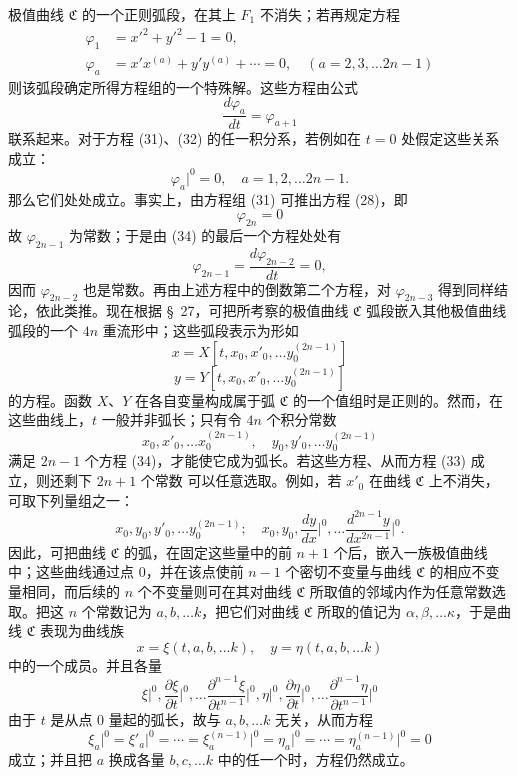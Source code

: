 \documentclass[11pt,a4paper,leqno]{article}
\begin{document}
极值曲线 $\mathfrak C$ 的一个正则弧段，在其上 $F_1$ 不消失；若再规定方程
\begin{equation}\tag{33}
\begin{aligned}
\varphi_1&=x'^2+y'^2-1=0,\\
\varphi_a&=x'x^{(a)}+y'y^{(a)}+\cdots=0,\quad (a=2,3,\ldots 2n-1)
\end{aligned}
\end{equation}
则该弧段确定所得方程组的一个特殊解。这些方程由公式
\[
\frac{d\varphi_a}{dt}=\varphi_{a+1}
\]
联系起来。对于方程 (31)、(32) 的任一积分系，若例如在 $t=0$ 处假定这些关系成立：
\begin{equation}\tag{34}
\varphi_a\bigg|^0=0,\quad a=1,2,\ldots 2n-1.
\end{equation}
那么它们处处成立。事实上，由方程组 (31) 可推出方程 (28)，即
\[
\varphi_{2n}=0
\]
故 $\varphi_{2n-1}$ 为常数；于是由 (34) 的最后一个方程处处有
\[
\varphi_{2n-1}=\frac{d\varphi_{2n-2}}{dt}=0,
\]
因而 $\varphi_{2n-2}$ 也是常数。再由上述方程中的倒数第二个方程，对 $\varphi_{2n-3}$ 得到同样结论，依此类推。现在根据 \S~27，可把所考察的极值曲线 $\mathfrak C$ 弧段嵌入其他极值曲线弧段的一个 $4n$ 重流形中；这些弧段表示为形如
\[
x=X[t,x_0,x'_0,\ldots y_0^{(2n-1)}]
\]
\[
y=Y[t,x_0,x'_0,\ldots y_0^{(2n-1)}]
\]
的方程。函数 $X$、$Y$ 在各自变量构成属于弧 $\mathfrak C$ 的一个值组时是正则的。然而，在这些曲线上，$t$ 一般并非弧长；只有令 $4n$ 个积分常数
\[
x_0,x'_0,\ldots x_0^{(2n-1)},\quad y_0,y'_0,\ldots y_0^{(2n-1)}
\]
满足 $2n-1$ 个方程 (34)，才能使它成为弧长。若这些方程、从而方程 (33) 成立，则还剩下 $2n+1$ 个常数
可以任意选取。例如，若 $x'_0$ 在曲线 $\mathfrak C$ 上不消失，可取下列量组之一：
\[
x_0,y_0,y'_0,\ldots y_0^{(2n-1)};\quad
x_0,y_0,\frac{dy}{dx}\bigg|^0,\ldots \frac{d^{2n-1}y}{dx^{2n-1}}\bigg|^0.
\]
因此，可把曲线 $\mathfrak C$ 的弧，在固定这些量中的前 $n+1$ 个后，嵌入一族极值曲线中；这些曲线通过点 0，并在该点使前 $n-1$ 个密切不变量与曲线 $\mathfrak C$ 的相应不变量相同，而后续的 $n$ 个不变量则可在其对曲线 $\mathfrak C$ 所取值的邻域内作为任意常数选取。把这 $n$ 个常数记为 $a,b,\ldots k$，把它们对曲线 $\mathfrak C$ 所取的值记为 $\alpha,\beta,\ldots\kappa$，于是曲线 $\mathfrak C$ 表现为曲线族
\begin{equation}\tag{35}
x=\xi(t,a,b,\ldots k),\quad y=\eta(t,a,b,\ldots k)
\end{equation}
中的一个成员。并且各量
\[
\xi\bigg|^0,\frac{\partial\xi}{\partial t}\bigg|^0,\ldots \frac{\partial^{n-1}\xi}{\partial t^{n-1}}\bigg|^0,
\eta\bigg|^0,\frac{\partial\eta}{\partial t}\bigg|^0,\ldots \frac{\partial^{n-1}\eta}{\partial t^{n-1}}\bigg|^0
\]
由于 $t$ 是从点 0 量起的弧长，故与 $a,b,\ldots k$ 无关，从而方程
\begin{equation}\tag{36}
\xi_a\bigg|^0=\xi'_a\bigg|^0=\cdots=\xi_a^{(n-1)}\bigg|^0=
\eta_a\bigg|^0=\cdots=\eta_a^{(n-1)}\bigg|^0=0
\end{equation}
成立；并且把 $a$ 换成各量 $b,c,\ldots k$ 中的任一个时，方程仍然成立。
\end{document}
